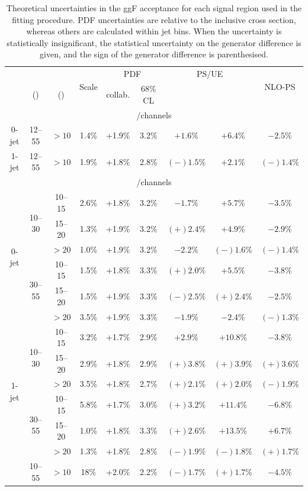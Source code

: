 \begin{table}
	\centering
	\begin{tabular}{ccc|cccccc}
		\toprule
		& \mll & \ptsubleadlep & \multirow{2}{*}{Scale} & \multicolumn{2}{c}{PDF} & \multicolumn{2}{c}{PS/UE} & \multirow{2}{*}{NLO-PS} \\
		& (\GeV) & (\GeV) & & collab. & 68\% CL & \pythia{6} & \fherwig & \\
		\midrule
		\multicolumn{9}{c}{\eech/\mmch channels} \\
		\midrule
		0-jet & 12--55 & $>10$ & 1.4\% & +1.9\% & 3.2\% &   $+1.6\%$ & $+6.4\%$ &   $-2.5\%$ \\
		1-jet & 12--55 & $>10$ & 1.9\% & +1.8\% & 2.8\% & $(-)1.5\%$ & $+2.1\%$ & $(-)1.4\%$ \\
		\midrule
		\multicolumn{9}{c}{\emch/\mech channels} \\
		\midrule
		\multirow{6}{*}{0-jet}
		& \multirow{3}{*}{10--30}
	    &  10--15 & 2.6\% & +1.8\% & 3.2\% &   $-1.7\%$ &   $+5.7\%$ &   $-3.5\%$ \\
		&& 15--20 & 1.3\% & +1.9\% & 3.2\% & $(+)2.4\%$ &   $+4.9\%$ &   $-2.9\%$ \\
		&&  $>20$ & 1.0\% & +1.9\% & 3.2\% &   $-2.2\%$ & $(-)1.6\%$ & $(-)1.4\%$ \\
		\cmidrule(lr){2-9}
		& \multirow{3}{*}{30--55}
		&  10--15 & 1.5\% & +1.8\% & 3.3\% & $(+)2.0\%$ &   $+5.5\%$ &   $-3.8\%$ \\
		&& 15--20 & 1.5\% & +1.9\% & 3.3\% & $(-)2.5\%$ & $(+)2.4\%$ &   $-2.5\%$ \\
		&&  $>20$ & 3.5\% & +1.9\% & 3.3\% &   $-1.9\%$ &   $-2.4\%$ & $(-)1.3\%$ \\
		\cmidrule(lr){1-9}
		\multirow{6}{*}{1-jet}
		& \multirow{3}{*}{10--30}
	    &  10--15 & 3.2\% & +1.7\% & 2.9\% &   $+2.9\%$ &  $+10.8\%$ &   $-3.8\%$ \\
		&& 15--20 & 2.9\% & +1.8\% & 2.9\% & $(+)3.8\%$ & $(+)3.9\%$ & $(+)3.6\%$ \\
		&&  $>20$ & 3.5\% & +1.8\% & 2.7\% & $(+)2.1\%$ & $(+)2.0\%$ & $(-)1.9\%$ \\
		\cmidrule(lr){2-9}
		& \multirow{3}{*}{30--55}
		&  10--15 & 5.8\% & +1.7\% & 3.0\% & $(+)3.2\%$ &  $+11.4\%$ &   $-6.8\%$ \\
		&& 15--20 & 1.0\% & +1.8\% & 3.3\% & $(+)2.6\%$ &  $+13.5\%$ &   $+6.7\%$ \\
		&&  $>20$ & 1.3\% & +1.8\% & 2.8\% & $(-)1.9\%$ & $(-)1.8\%$ & $(+)1.7\%$ \\
		\cmidrule(lr){1-9}
		\twojet & 10--55 & $>10$ &  18\% & +2.0\% & 2.2\% & $(-)1.7\%$ & $(+)1.7\%$ & $-4.5\%$ \\
		\bottomrule
	\end{tabular}
	\caption{Theoretical uncertainties in the ggF acceptance for each signal region used 
	in the fitting procedure. PDF uncertainties are relative to the inclusive cross 
	section, whereas others are calculated within jet bins. When the uncertainty is 
	statistically insignificant, the statistical uncertainty on the generator difference 
	is given, and the sign of the generator difference is parenthesised.}
	\label{tab:signal:acc_unc}
\end{table}



